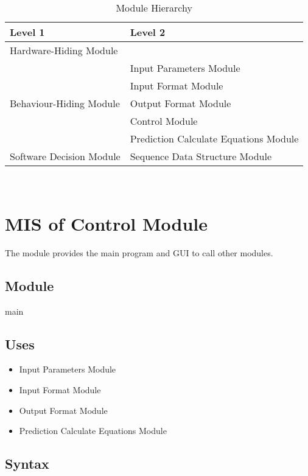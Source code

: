 \documentclass[12pt, titlepage]{article}
\begin{document}
\begin{table}[h!]
\centering
\begin{tabular}{p{} p{}}
\toprule
\textbf{Level 1} & \textbf{Level 2}\\
\midrule

{Hardware-Hiding Module} & ~ \\
\midrule

\multirow{5}{0.3\textwidth}{Behaviour-Hiding Module} 
& Input Parameters Module\\
& Input Format Module\\
& Output Format Module\\
& Control Module\\
& Prediction Calculate Equations Module\\
\midrule

\multirow{1}{0.3\textwidth}{Software Decision Module} 
& Sequence Data Structure Module\\
\bottomrule

\end{tabular}
\caption{Module Hierarchy}
\label{TblMH}
\end{table}

\newpage
~\newpage
\section{MIS of Control Module}
The module provides the main program and GUI to call other modules.

\subsection{Module}
main

\subsection{Uses}
\begin{itemize}
    \item Input Parameters Module
    \item Input Format Module
    \item Output Format Module
    \item Prediction Calculate Equations Module
\end{itemize}

\subsection{Syntax}
\end{document}
